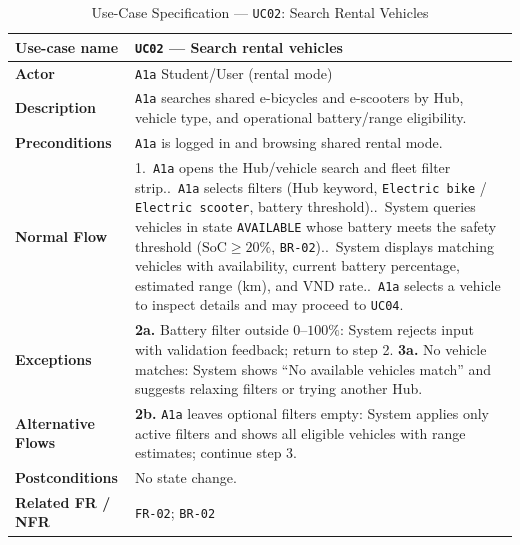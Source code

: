 \begin{table}[H]
  \centering
  \singlespacing\footnotesize
  \caption{Use-Case Specification --- \texttt{UC02}: Search Rental Vehicles}
  \label{tab:uc02}
  \renewcommand{\arraystretch}{1.13}
  \begin{tabularx}{\textwidth}{|L{2.9cm}|Y|}
    \hline
    \textbf{Use-case name} & \textbf{\texttt{UC02} --- Search rental vehicles} \\
    \hline
    \textbf{Actor} & \texttt{A1a} Student/User (rental mode) \\
    \hline
    \textbf{Description} & \texttt{A1a} searches shared e-bicycles and e-scooters by Hub, vehicle type, and operational battery/range eligibility. \\
    \hline
    \textbf{Preconditions} & \texttt{A1a} is logged in and browsing shared rental mode. \\
    \hline
    \textbf{Normal Flow} & 1.\ \texttt{A1a} opens the Hub/vehicle search and fleet filter strip..\ \texttt{A1a} selects filters (Hub keyword, \texttt{Electric bike} / \texttt{Electric scooter}, battery threshold)..\ System queries vehicles in state \texttt{AVAILABLE} whose battery meets the safety threshold ($\text{SoC} \ge 20\%$, \texttt{BR-02})..\ System displays matching vehicles with availability, current battery percentage, estimated range (km), and VND rate..\ \texttt{A1a} selects a vehicle to inspect details and may proceed to \texttt{UC04}. \\
    \hline
    \textbf{Exceptions} & \textbf{2a.} Battery filter outside $0\text{--}100\%$: System rejects input with validation feedback; return to step 2.\newline
    \textbf{3a.} No vehicle matches: System shows ``No available vehicles match'' and suggests relaxing filters or trying another Hub. \\
    \hline
    \textbf{Alternative Flows} & \textbf{2b.} \texttt{A1a} leaves optional filters empty: System applies only active filters and shows all eligible vehicles with range estimates; continue step 3. \\
    \hline
    \textbf{Postconditions} & No state change. \\
    \hline
    \textbf{Related FR / NFR} & \texttt{FR-02}; \texttt{BR-02} \\
    \hline
  \end{tabularx}
\end{table}

